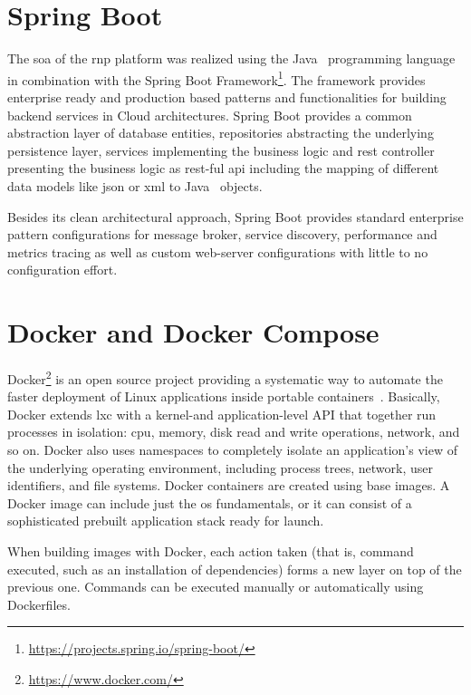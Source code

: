 \documentclass[
a4paper,
twoside,
headsepline,
cleardoublepage=empty,
parskip=half,
draft=false
]{scrbook}
\begin{document}
		\section{Spring Boot}\label{sec:spring_boot}

			The \gls{soa} of the \gls{rnp} platform was realized using the Java~\cite{java2015} programming language in combination with the Spring Boot Framework\footnote{\url{https://projects.spring.io/spring-boot/}}. The framework provides enterprise ready and production based patterns and functionalities for building backend services in Cloud architectures. Spring Boot provides a common abstraction layer of database entities, repositories abstracting the underlying persistence layer, services implementing the business logic and \gls{rest} controller presenting the business logic as \gls{rest}-ful \gls{api} including the mapping of different data models like \gls{json} or \gls{xml} to Java~\cite{java2015} objects.
			
			Besides its clean architectural approach, Spring Boot provides standard enterprise pattern configurations for message broker, service discovery, performance and metrics tracing as well as custom web-server configurations with little to no configuration effort.

		\section{Docker and Docker Compose}\label{sec:docker}
		
			Docker\footnote{\url{https://www.docker.com/}} is an open source project providing a systematic way to automate the faster deployment of Linux applications inside portable containers~\cite{bernstein2014containers}. 
			Basically, Docker extends \gls{lxc} with a kernel-and application-level API that together run processes in isolation: \gls{cpu}, memory, disk read and write operations, network, and so on. 
			Docker also uses namespaces to completely isolate an application’s view of the underlying operating environment, including process trees, network, user identifiers, and file systems.
			Docker containers are created using base images.
			A Docker image can include just the \gls{os} fundamentals, or it can consist of a sophisticated prebuilt application stack ready for launch. 
			
			When building images with Docker, each action taken (that is, command executed, such as an installation of dependencies) forms a new layer on top of the previous one. 
			Commands can be executed manually or automatically using Dockerfiles.
			
\end{document}
